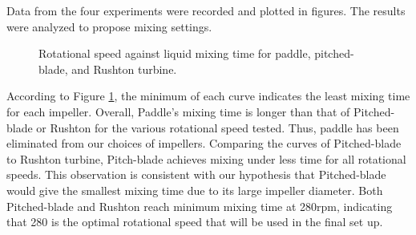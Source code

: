 Data from the four experiments were recorded and plotted in figures. The results were analyzed to propose mixing settings.

\begin{figure}[h]
	\centering
	\caption{Rotational speed against liquid mixing time for paddle, pitched-blade, and Rushton turbine.}
	\label{fig:RotationalSpeed-MixingTime}
\end{figure}
According to Figure \ref{fig:RotationalSpeed-MixingTime}, the minimum of each curve indicates the least mixing time for each impeller. Overall, Paddle’s mixing time is longer than that of Pitched-blade or Rushton for the various rotational speed tested. Thus, paddle has been eliminated from our choices of impellers. Comparing the curves of Pitched-blade to Rushton turbine, Pitch-blade achieves mixing under less time for all rotational speeds. This observation is consistent with our hypothesis that Pitched-blade would give the smallest mixing time due to its large impeller diameter. Both Pitched-blade and Rushton reach minimum mixing time at 280rpm, indicating that 280 is the optimal rotational speed that will be used in the final set up. 